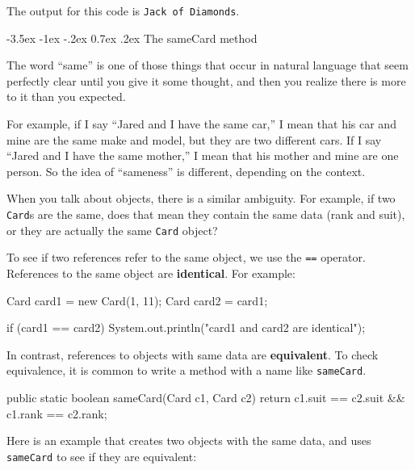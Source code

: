 \documentclass[12pt]{book}
\makeatletter
\renewcommand{\section}{\@startsection {section}{1}{\z@}%
    {-3.5ex \@plus -1ex \@minus -.2ex}%
    {0.7ex \@plus.2ex}%
    {\normalfont\Large\bfseries}}
\theoremstyle{exercise}
\newcommand{\java}[1]{\lstinline{#1}} %
\makeatother
\begin{document}
The output for this code is {\tt Jack of Diamonds}.


\section{The sameCard method}
\label{equivalence}

The word ``same'' is one of those things that occur in natural language that seem perfectly clear until you give it some thought, and then you realize there is more to it than you expected.


For example, if I say ``Jared and I have the same car,'' I mean that his car and mine are the same make and model, but they are
two different cars.
If I say ``Jared and I have the same mother,'' I mean that his mother and mine are one person.
So the idea of ``sameness'' is different, depending on the context.


When you talk about objects, there is a similar ambiguity.
For example, if two \java{Card}s are the same, does that mean they contain the same data (rank and suit), or they are actually
the same \java{Card} object?


To see if two references refer to the same object, we use the \java{==} operator.
References to the same object are {\bf identical}.
For example:

\begin{code}
    Card card1 = new Card(1, 11);
    Card card2 = card1;

    if (card1 == card2) {
        System.out.println("card1 and card2 are identical");
    }
\end{code}


In contrast, references to objects with same data are {\bf equivalent}.
To check equivalence, it is common to write a method with a name like \java{sameCard}.

\begin{code}
    public static boolean sameCard(Card c1, Card c2) {
        return c1.suit == c2.suit && c1.rank == c2.rank;
    }
\end{code}

Here is an example that creates two objects with the same data, and uses \java{sameCard} to see if they are equivalent:
\end{document}
